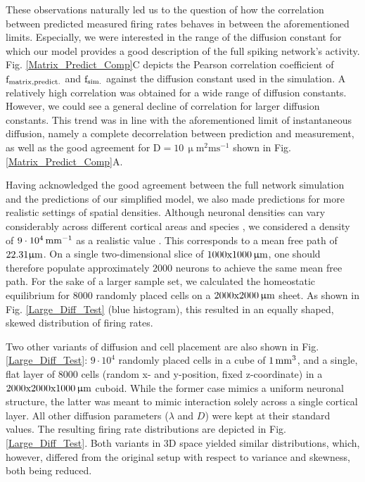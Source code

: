\documentclass[10pt,letterpaper]{article}
\begin{document}
These observations naturally led us to the question of how the correlation between predicted measured firing rates behaves in between the aforementioned limits. Especially, we were interested in the range of the diffusion constant for which our model provides a good description of the full spiking network's activity. Fig. \ref{Matrix_Predict_Comp}C depicts the Pearson correlation coefficient of $\mathrm{f_{\rm matrix, predict.}}$ and $\mathrm{f_{\rm sim.}}$ against the diffusion constant used in the simulation. A relatively high correlation was obtained for a wide range of diffusion constants. However, we could see a general decline of correlation for larger diffusion constants. This trend was in line with the aforementioned limit of instantaneous diffusion, namely a complete decorrelation between prediction and measurement, as well as the good agreement for $\mathrm{D= 10\, \upmu m^2 ms^{-1}}$ shown in Fig. \ref{Matrix_Predict_Comp}A.

Having acknowledged the good agreement between the full network simulation and the predictions of our simplified model, we also made predictions for more realistic settings of spatial densities. Although neuronal densities can vary considerably across different cortical areas and species \cite{Collins_2010}, we considered a density of $\rm 9\cdot 10^4\, mm^{-1}$ as a realistic value \cite{Schuez_1989}. This corresponds to a mean free path of $\rm 22.31 \upmu m$. On a single two-dimensional slice of $\rm 1000x1000\, \upmu m$, one should therefore populate approximately $2000$ neurons to achieve the same mean free path. For the sake of a larger sample set, we calculated the homeostatic equilibrium for $8000$ randomly placed cells on a $\rm 2000x2000\, \upmu m$ sheet. As shown in Fig. \ref{Large_Diff_Test} (blue histogram), this resulted in an equally shaped, skewed distribution of firing rates.  

Two other variants of diffusion and cell placement are also shown in Fig. \ref{Large_Diff_Test}: $9\cdot 10^4$ randomly placed cells in a cube of $\rm 1\, mm^3$, and a single, flat layer of $8000$ cells (random x- and y-position, fixed z-coordinate) in a $\rm 2000x2000x1000 \, \upmu m$ cuboid. While the former case mimics a uniform neuronal structure, the latter was meant to mimic interaction solely across a single cortical layer. All other diffusion parameters ($\lambda$ and $D$) were kept at their standard values. The resulting firing rate distributions are depicted in Fig. \ref{Large_Diff_Test}. Both variants in 3D space yielded similar distributions, which, however, differed from the original setup with respect to variance and skewness, both being reduced.
\end{document}
